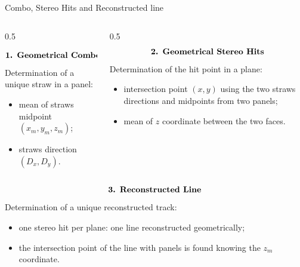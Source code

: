 \documentclass{beamer}[10pt]
\begin{document}
  \begin{frame}{Combo, Stereo Hits and Reconstructed line}
    \vspace{-3mm}
\begin{columns}
  \begin{column}{0.5\framewidth}
    \vspace{-15mm}

    $$\textbf{\text{1. Geometrical Combo Hits}}$$
    Determination of a unique straw in a panel:
    \begin{itemize}
      \item mean of straws midpoint $(x_m,y_m,z_m)$;
      \item straws direction $(D_x,D_y)$.
    \end{itemize}
  \end{column}
  \begin{column}{0.5\framewidth}
    $$\textbf{\text{2. Geometrical Stereo Hits}}$$
    Determination of the hit point in a plane:
    \begin{itemize}
      \item intersection point $(x,y)$ using the two straws directions and midpoints from two panels;
      \item mean of $z$ coordinate between the two faces.
    \end{itemize}
  \end{column}
\end{columns}
\vspace{5mm}

$$\textbf{\text{3. Reconstructed Line}}$$
Determination of a unique reconstructed track:
\begin{itemize}
  \item one stereo hit per plane: one line reconstructed geometrically;
  \item the intersection point of the line with panels is found knowing the $z_m$ coordinate. 
\end{itemize}

  \end{frame}
\end{document}
